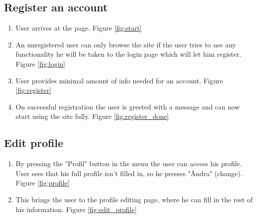 \documentclass[paper=a4, fontsize=11pt]{report} %
\begin{document}
	\subsection*{Register an account}
	\begin{enumerate}
		\item User arrives at the page. Figure \ref{fig:start}
		\item An unregistered user can only browse the site if the user tries to use any functionality he will be taken to the login page which will let him register. Figure \ref{fig:login}
		\item User provides minimal amount of info needed for an account. Figure \ref{fig:register}
		\item On successful registration the user is greeted with a message and can now start using the site fully. Figure \ref{fig:register_done}
	\end{enumerate}


	\subsection*{Edit profile}
	\begin{enumerate}
		\item By pressing the "Profil" button in the menu the user can access his profile. User sees that his full profile isn't filled in, so he presses "Ändra" (change). Figure \ref{fig:profile}
		\item This brings the user to the profile editing page, where he can fill in the rest of his information. Figure \ref{fig:edit_profile}
	\end{enumerate}
\end{document}
